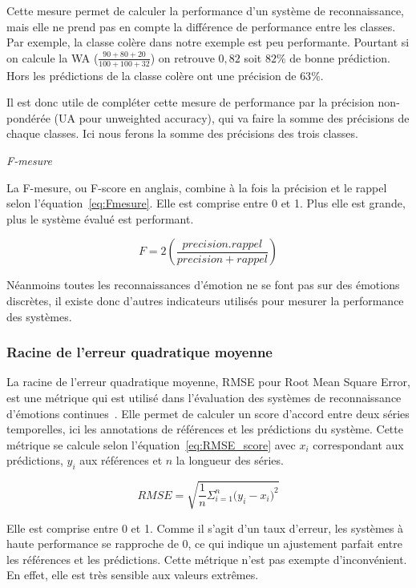Cette mesure permet de calculer la performance d'un système de reconnaissance, mais elle ne prend pas en compte la différence de performance entre les classes. Par exemple, la classe colère dans notre exemple est peu performante. Pourtant si on calcule la WA ($\frac{90+80+20}{100+100+32}$) on retrouve $0,82$ soit $82\%$ de bonne prédiction. Hors les prédictions de la classe colère ont une précision de $63\%$.

Il est donc utile de compléter cette mesure de performance par la précision non-pondérée (UA pour unweighted accuracy), qui va faire la somme des précisions de chaque classes. Ici nous ferons la somme des précisions des trois classes.

\vspace{1cm}
\textit{F-mesure}

La F-mesure, ou F-score en anglais, combine à la fois la précision et le rappel selon l'équation~\ref{eq:Fmesure}. Elle est comprise entre 0 et 1. Plus elle est grande, plus le système évalué est performant.

\begin{equation}
  F = 2 \left( \frac{precision.rappel}{precision+rappel} \right)
  \label{eq:Fmesure}
\end{equation}

Néanmoins toutes les reconnaissances d'émotion ne se font pas sur des émotions discrètes, il existe donc d'autres indicateurs utilisés pour mesurer la performance des systèmes.

\subsubsection{Racine de l'erreur quadratique moyenne}
La racine de l'erreur quadratique moyenne, RMSE pour Root Mean Square Error, est une métrique qui est utilisé dans l'évaluation des systèmes de reconnaissance d'émotions continues~\cite{AVEC2017}. Elle permet de calculer un score d'accord entre deux séries temporelles, ici les annotations de références et les prédictions du système. Cette métrique se calcule selon l'équation~\ref{eq:RMSE_score} avec $x_i$ correspondant aux prédictions, $y_i$ aux références et $n$ la longueur des séries.

\begin{equation}
    RMSE = \sqrt{\frac{1}{n}\Sigma_{i=1}^{n}{\Big(y_i - x_i\Big)^2}}
\label{eq:RMSE_score}
\end{equation}

Elle est comprise entre 0 et 1. Comme il s'agit d'un taux d'erreur, les systèmes à haute performance se rapproche de 0, ce qui indique un ajustement parfait entre les références et les prédictions. Cette métrique n'est pas exempte d'inconvénient. En effet, elle est très sensible aux valeurs extrêmes.

